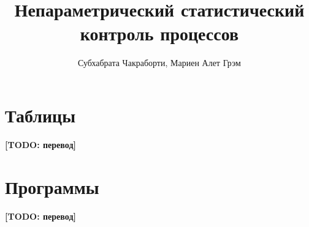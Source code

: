 \documentclass[12pt,a4paper]{report}
\title{Непараметрический статистический контроль процессов}
\author{Субхабрата Чакраборти, Мариен Алет Грэм}
\date{}
\newcommand{\todo}[1]{\textbf{[TODO: #1]}}
\begin{document}
\maketitle
\tableofcontents
\newpage






\appendix
\chapter{Таблицы}
\todo{перевод}

\chapter{Программы}
\todo{перевод}

% 
% 
\end{document}
